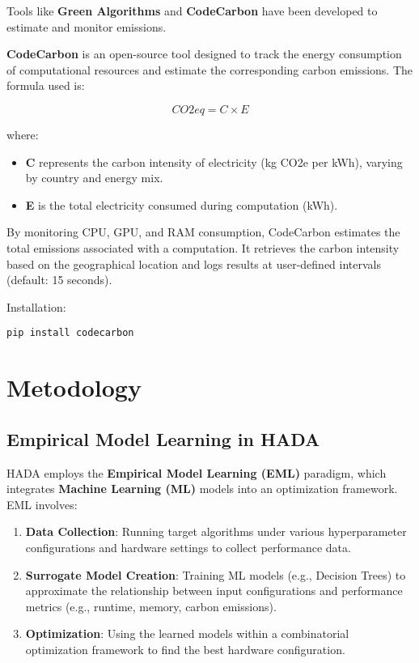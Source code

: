 \documentclass[a4paper,singleside,12pt]{report} %
\begin{document}
Tools like \textbf{Green Algorithms} and 
\textbf{CodeCarbon} have been developed to estimate and monitor emissions.

\textbf{CodeCarbon} is an open-source tool designed to track the energy consumption of computational resources 
and estimate the corresponding carbon emissions. The formula used is:

\begin{equation}
CO2eq = C \times E
\end{equation}

where:
\begin{itemize}
\item \textbf{C} represents the carbon intensity of electricity (kg CO2e per kWh), varying by country and energy mix.
\item \textbf{E} is the total electricity consumed during computation (kWh).
\end{itemize}

By monitoring CPU, GPU, and RAM consumption, CodeCarbon estimates the total emissions associated with a computation. 
It retrieves the carbon intensity based on the geographical location and logs results at user-defined intervals 
(default: 15 seconds).

Installation:
\begin{verbatim}
pip install codecarbon
\end{verbatim}

\chapter{Metodology}

\section{Empirical Model Learning in HADA}

HADA employs the \textbf{Empirical Model Learning (EML)} paradigm, which integrates \textbf{Machine Learning (ML)} models 
into an optimization framework. EML involves:

\begin{enumerate}
\item \textbf{Data Collection}: Running target algorithms under various hyperparameter configurations and hardware settings 
to collect performance data.
\item \textbf{Surrogate Model Creation}: Training ML models (e.g., Decision Trees) to approximate the relationship between 
input configurations and performance metrics (e.g., runtime, memory, carbon emissions).
\item \textbf{Optimization}: Using the learned models within a combinatorial optimization framework to find the best hardware
 configuration.
\end{enumerate}
\end{document}
